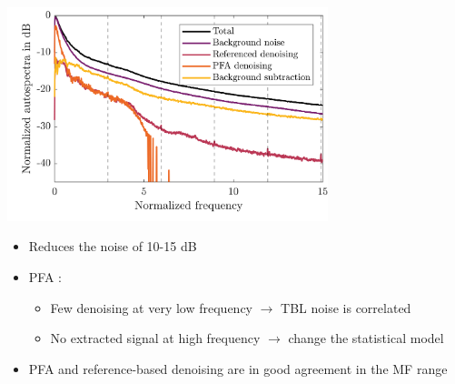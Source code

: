 \documentclass[10pt,xcolor=x11names,compress, show notes]{beamer}%
\begin{document}
\begin{frame}{\insertsectionhead}
	\centering
	\includegraphics[width=0.7\textwidth]{airbus/mean_as.png}\\
	\vfill
	\small
		\begin{itemize}
        		\item Reduces the noise of 10-15 dB
        		\item PFA :        
        		\begin{itemize}
       		 	\item Few denoising at very low frequency $\rightarrow$ TBL noise is correlated
       		 	\item No extracted signal at high frequency $\rightarrow$ change the statistical model
		\end{itemize}
		\item PFA and reference-based denoising are in good agreement in the MF range
		
	\end{itemize}
\end{frame}
\end{document}
